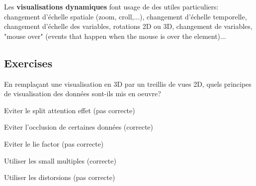 Les \textbf{visualisations dynamiques} font usage de des utiles particuliers: changement d'\'echelle spatiale (zoom, croll,...), changement d'\'echelle temporelle, changement d'\'echelle des variables, rotations 2D ou 3D, changement de variables, "mouse over" (events that happen when the mouse is over the element)...

\subsection{Exercises}

\begin{figure}[H]
\centering
{}
\end{figure}

\begin{exercise}
En rempla\c{c}ant une visualisation en 3D par un treillis de vues 2D, quels principes de visualisation des donn\'ees sont-ils mis en oeuvre? 
\end{exercise}

Eviter le split attention effet (pas correcte)

Eviter l'occlusion de certaines donn\'ees (correcte)

Eviter le lie factor (pas correcte)

Utiliser les small multiples (correcte)

Utiliser les distorsions (pas correcte)














